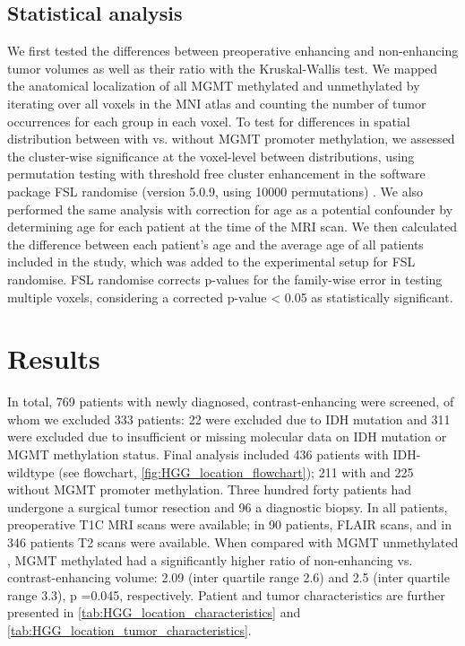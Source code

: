 \subsection{Statistical analysis}
We first tested the differences between preoperative enhancing and non-enhancing \gls{tumor} volumes as well as their ratio with the Kruskal-Wallis test.
We mapped the anatomical localization of all \gls{MGMT} methylated and unmethylated  by iterating over all voxels in the \gls{MNI} atlas and counting the number of \gls{tumor} occurrences for each group in each voxel.
To test for differences in spatial distribution between  with vs. without \gls{MGMT} promoter methylation, we assessed the cluster-wise significance at the voxel-level between distributions, using permutation testing with threshold free cluster enhancement in the software package \gls{FSL} randomise (version 5.0.9, using \num{10000} permutations) \autocite{smith2009threshold, winkler2014permutation}.
We also performed the same analysis with correction for age as a potential confounder by determining age for each patient at the time of the \gls{MRI} scan.
We then calculated the difference between each patient's age and the average age of all patients included in the study, which was added to the experimental setup for \gls{FSL} randomise.
\gls{FSL} randomise corrects p-values for the family-wise error in testing multiple voxels, considering a corrected p-value \num{< 0.05} as statistically significant.


\section{Results}


In total, 769 patients with newly diagnosed, contrast-enhancing  were screened, of whom we excluded 333 patients: 22 were excluded due to \gls{IDH} mutation and 311 were excluded due to insufficient or missing molecular data on \gls{IDH} mutation or \gls{MGMT} methylation status.
Final analysis included 436 patients with \gls{IDH}-wildtype  (see flowchart, \cref{fig:HGG_location_flowchart}); 211 with and 225 without \gls{MGMT} promoter methylation.
Three hundred forty patients had undergone a surgical \gls{tumor} resection and 96 a diagnostic biopsy.
In all patients, preoperative \gls{T1C} \gls{MRI} scans were available; in 90 patients, \gls{FLAIR} scans, and in 346 patients \gls{T2} scans were available.
When compared with \gls{MGMT} unmethylated , \gls{MGMT} methylated  had a significantly higher ratio of non-enhancing vs. contrast-enhancing volume: \num{2.09} (inter quartile range \num{2.6}) and \num{2.5} (inter quartile range \num{3.3}), p \num{=0.045}, respectively.
Patient and \gls{tumor} characteristics are further presented in \cref{tab:HGG_location_characteristics} and \cref{tab:HGG_location_tumor_characteristics}.

